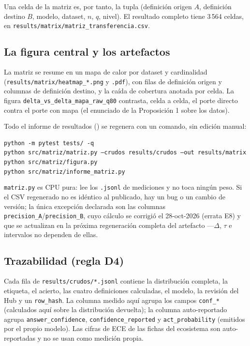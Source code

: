 Una celda de la matriz es, por tanto, la tupla (definición origen $A$, definición destino $B$,
modelo, dataset, $n$, $q$, nivel). El resultado completo tiene 3\,564 celdas, en
\texttt{results/matrix/matriz\_transferencia.csv}.

\subsection{La figura central y los artefactos}

La matriz se resume en un mapa de calor por dataset y cardinalidad (\texttt{results/matrix/heatmap\_*.png} y
\texttt{.pdf}), con filas de definición origen y columnas de definición destino, y la caída de cobertura
anotada por celda. La figura \texttt{delta\_vs\_delta\_mapa\_raw\_q80} contrasta, celda a celda, el porte
directo contra el porte con mapa (el enunciado de la Proposición 1 sobre los datos).

Todo el informe de resultados () se regenera con un comando, sin
edición manual:

{\small
\begin{flushleft}
\texttt{python -m pytest tests/ -q}\\
\texttt{python src/matriz/\allowbreak matriz.py --crudos results/\allowbreak crudos --out results/\allowbreak matrix}\\
\texttt{python src/matriz/figura.py}\\
\texttt{python src/matriz/informe\_matriz.py}
\end{flushleft}}

\texttt{matriz.py} es CPU pura: lee los \texttt{.jsonl} de mediciones y no toca ningún peso. Si el CSV
regenerado no es idéntico al publicado, hay un bug o un cambio de versión; la única excepción declarada son las
columnas \texttt{precision\_A}/\texttt{precision\_B}, cuyo cálculo se corrigió el 28-oct-2026 (errata E8) y que
se actualizan en la próxima regeneración completa del artefacto ---$\Delta$, $\tau$ e intervalos no dependen de
ellas.

\subsection{Trazabilidad (regla D4)}

Cada fila de \texttt{results/crudos/*.jsonl} contiene la distribución completa, la etiqueta, el acierto, las
cuatro definiciones calculadas, el modelo, la revisión del Hub y un \texttt{row\_hash}. La columna
medido aquí agrupa los campos \texttt{conf\_*} (calculados aquí sobre la distribución devuelta); la
columna auto-reportado agrupa \texttt{answer\_confidence}, \texttt{confidence\_reported} y
\texttt{act\_probability} (emitidos por el propio modelo). Las cifras de ECE de las fichas del ecosistema son
auto-reportadas y no se usan como medición propia.

